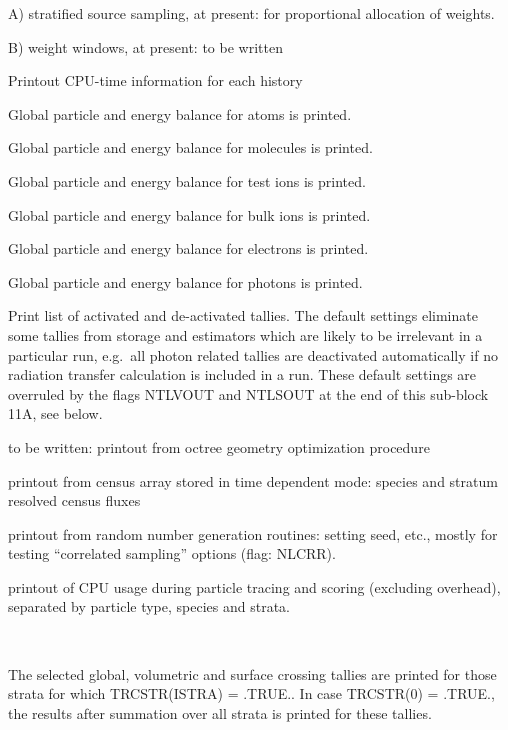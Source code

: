 \begin{description}
        A) stratified source sampling, at present:
        for proportional allocation of weights.

        B) weight windows, at present: to be written
  \item[TRCTIM] Printout CPU-time
        information for each history
  \item[TRCBLA] Global particle and energy balance
        for atoms is printed.
  \item[TRCBLM] Global particle and energy balance for molecules is printed.
  \item[TRCBLI] Global particle and energy balance for test ions is printed.
  \item[TRCBLP] Global particle and energy balance for bulk ions is printed.
  \item[TRCBLE] Global particle and energy balance for electrons is printed.
  \item[TRCBLPH] Global particle and energy balance for photons is printed.
  \item[TRCTAL] Print list of activated and de-activated tallies.
        The default settings eliminate some tallies from storage and estimators which
        are likely to be irrelevant in a particular run, e.g.\ all photon related
        tallies are deactivated automatically if no radiation transfer calculation is
        included in a run.
        These default settings are overruled by the flags NTLVOUT and NTLSOUT at the
        end of this sub-block 11A, see below.
  \item[TRCOCT] to be written: printout from octree geometry optimization
        procedure
  \item[TRCCEN] printout from census array stored in time dependent
        mode:
        species and stratum resolved census fluxes
  \item[TRCRNF] printout from random number generation routines: setting seed,
        etc., mostly for testing ``correlated sampling'' options (flag: NLCRR).
  \item[TRCHKTIM] printout of CPU usage during particle tracing and scoring
        (excluding overhead), separated by particle type, species and strata.
  \item[TRCSRC(ISTRA), ISTRA = 0, NSTRAI] ~ 

        The selected global, volumetric and surface crossing tallies are printed for
        those strata for which TRCSTR(ISTRA) = .TRUE..
        In case TRCSTR(0) = .TRUE., the results after summation over all strata is
        printed for these tallies.


\end{description}
